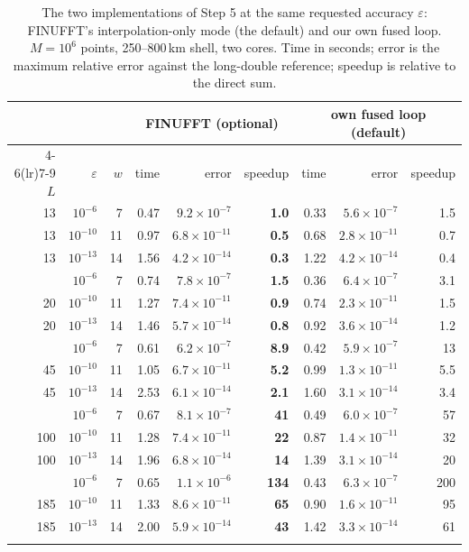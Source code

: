\begin{table}[!htbp]\centering\small
\caption{The two implementations of Step 5 at the same requested accuracy $\varepsilon$: FINUFFT's interpolation-only mode (the default)
and our own fused loop. $M=10^6$ points, 250--800\,km shell, two cores. Time in seconds; error is the maximum relative error against the long-double
reference; speedup is relative to the direct sum.}\label{tab:backends}
\begin{tabular}{rr r rrr rrr}\toprule
&&&\multicolumn{3}{c}{FINUFFT (optional)}&\multicolumn{3}{c}{own fused loop (default)}\\
\cmidrule(lr){4-6}\cmidrule(lr){7-9}
$L$&$\varepsilon$&$w$&time&error&speedup&time&error&speedup\\\midrule
13 & $10^{-6}$ & 7 & 0.47 & $9.2\times10^{-7}$ & \textbf{1.0} & 0.33 & $5.6\times10^{-7}$ & 1.5\\
13 & $10^{-10}$ & 11 & 0.97 & $6.8\times10^{-11}$ & \textbf{0.5} & 0.68 & $2.8\times10^{-11}$ & 0.7\\
13 & $10^{-13}$ & 14 & 1.56 & $4.2\times10^{-14}$ & \textbf{0.3} & 1.22 & $4.2\times10^{-14}$ & 0.4\\\addlinespace[2pt]
20 & $10^{-6}$ & 7 & 0.74 & $7.8\times10^{-7}$ & \textbf{1.5} & 0.36 & $6.4\times10^{-7}$ & 3.1\\
20 & $10^{-10}$ & 11 & 1.27 & $7.4\times10^{-11}$ & \textbf{0.9} & 0.74 & $2.3\times10^{-11}$ & 1.5\\
20 & $10^{-13}$ & 14 & 1.46 & $5.7\times10^{-14}$ & \textbf{0.8} & 0.92 & $3.6\times10^{-14}$ & 1.2\\\addlinespace[2pt]
45 & $10^{-6}$ & 7 & 0.61 & $6.2\times10^{-7}$ & \textbf{8.9} & 0.42 & $5.9\times10^{-7}$ & 13\\
45 & $10^{-10}$ & 11 & 1.05 & $6.7\times10^{-11}$ & \textbf{5.2} & 0.99 & $1.3\times10^{-11}$ & 5.5\\
45 & $10^{-13}$ & 14 & 2.53 & $6.1\times10^{-14}$ & \textbf{2.1} & 1.60 & $3.1\times10^{-14}$ & 3.4\\\addlinespace[2pt]
100 & $10^{-6}$ & 7 & 0.67 & $8.1\times10^{-7}$ & \textbf{41} & 0.49 & $6.0\times10^{-7}$ & 57\\
100 & $10^{-10}$ & 11 & 1.28 & $7.4\times10^{-11}$ & \textbf{22} & 0.87 & $1.4\times10^{-11}$ & 32\\
100 & $10^{-13}$ & 14 & 1.96 & $6.8\times10^{-14}$ & \textbf{14} & 1.39 & $3.1\times10^{-14}$ & 20\\\addlinespace[2pt]
185 & $10^{-6}$ & 7 & 0.65 & $1.1\times10^{-6}$ & \textbf{134} & 0.43 & $6.3\times10^{-7}$ & 200\\
185 & $10^{-10}$ & 11 & 1.33 & $8.6\times10^{-11}$ & \textbf{65} & 0.90 & $1.6\times10^{-11}$ & 95\\
185 & $10^{-13}$ & 14 & 2.00 & $5.9\times10^{-14}$ & \textbf{43} & 1.42 & $3.3\times10^{-14}$ & 61\\\addlinespace[2pt]
\bottomrule\end{tabular}\end{table}
